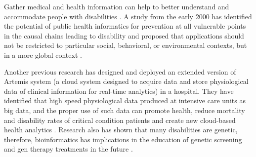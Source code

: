 Gather medical and health information can help to better understand and
accommodate people with disabilities \cite{Riga13}. A study from the early 2000 has identified the
potential of public health informatics for prevention at all vulnerable points in the causal chains leading
to disability and proposed that  applications should not be restricted to particular social, behavioral,
or environmental contexts, but in a more global context \cite{Yasnoff}.  

Another previous research has
designed and deployed an extended version of Artemis system (a cloud system designed to acquire data and
store physiological data of clinical information for real-time analytics) in a hospital. They have
identified that high speed physiological data produced at intensive care units as big data, and the proper
use of such data can promote health, reduce mortality and disability rates of critical condition patients
and create new cloud-based health analytics \cite{Khazaei14}. Research also has shown that many
disabilities are genetic, therefore, bioinformatics has implications in the education of genetic screening
and gen therapy treatments in the future \cite{Appleyard2005}.

